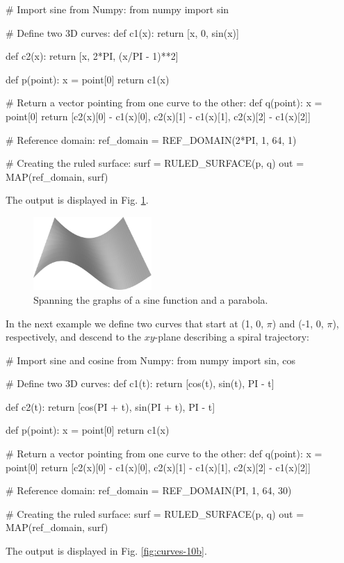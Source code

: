 \begin{bluecode}
# Import sine from Numpy:
from numpy import sin

# Define two 3D curves:
def c1(x):
    return [x, 0, sin(x)]

def c2(x):
    return [x, 2*PI, (x/PI - 1)**2]
  
def p(point):
    x = point[0]
    return c1(x)
  
# Return a vector pointing from one curve to the other:
def q(point):
    x = point[0]
    return [c2(x)[0] - c1(x)[0], c2(x)[1] - c1(x)[1], 
            c2(x)[2] - c1(x)[2]]
  
# Reference domain:
ref_domain = REF_DOMAIN(2*PI, 1, 64, 1)

# Creating the ruled surface:
surf = RULED_SURFACE(p, q)
out = MAP(ref_domain, surf)
\end{bluecode}
The output is displayed in Fig. \ref{fig:curves-10}.\\

\begin{figure}[!ht]
\begin{center}
\includegraphics[width=0.4\textwidth]{img/curves-10.png}
\end{center}
\vspace{-4mm}
\caption{Spanning the graphs of a sine function and a parabola.}
\label{fig:curves-10}
\end{figure}
\noindent
In the next example we define 
two curves that start at (1, 0, $\pi$) and (-1, 0, $\pi$), respectively,
and descend to the $xy$-plane describing a spiral trajectory:

\begin{bluecode}
# Import sine and cosine from Numpy:
from numpy import sin, cos

# Define two 3D curves:
def c1(t):
    return [cos(t), sin(t), PI - t]

def c2(t):
    return [cos(PI + t), sin(PI + t), PI - t]
  
def p(point):
    x = point[0]
    return c1(x)
  
# Return a vector pointing from one curve to the other:
def q(point):
    x = point[0]
    return [c2(x)[0] - c1(x)[0], c2(x)[1] - c1(x)[1], 
            c2(x)[2] - c1(x)[2]]
  
# Reference domain:
ref_domain = REF_DOMAIN(PI, 1, 64, 30)

# Creating the ruled surface:
surf = RULED_SURFACE(p, q)
out = MAP(ref_domain, surf)
\end{bluecode}
The output is displayed in Fig. \ref{fig:curves-10b}.\\

